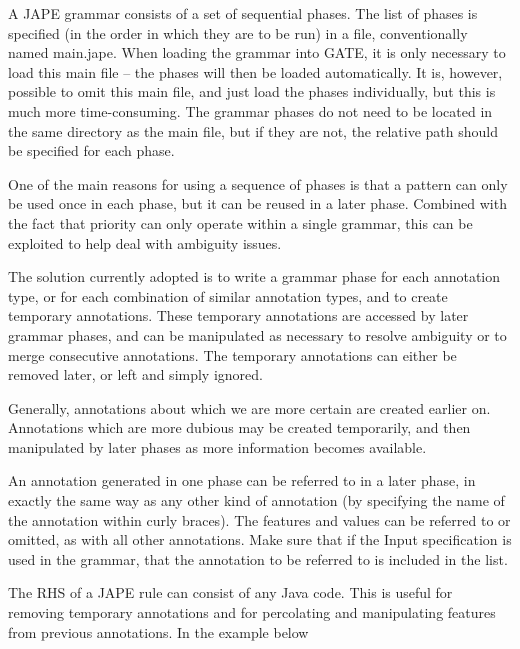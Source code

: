 
A JAPE grammar consists of a set of sequential phases. The list of
phases is specified (in the order in which they are to be run) in a
file, conventionally named main.jape. When loading the grammar into
GATE, it is only necessary to load this main file -- the phases will
then be loaded automatically. It is, however, possible to omit this
main file, and just load the phases individually, but this is much
more time-consuming. The grammar phases do not need to be located in
the same directory as the main file, but if they are not, the relative
path should be specified for each phase.

One of the main reasons for using a sequence of phases is that a
pattern can only be used once in each phase, but it can be reused in a
later phase. Combined with the fact that priority can only operate
within a single grammar, this can be exploited to help deal with
ambiguity issues.

The solution currently adopted is to write a grammar phase for each
annotation type, or for each combination of similar annotation types,
and to create temporary annotations. These temporary annotations are
accessed by later grammar phases, and can be manipulated as necessary
to resolve ambiguity or to merge consecutive annotations. The temporary
annotations can either be removed later, or left and simply ignored.

Generally, annotations about which we are more certain are created
earlier on. Annotations which are more dubious may be created
temporarily, and then manipulated by later phases as more information
becomes available.

An annotation generated in one phase can be referred to in a later phase, in
exactly the same way as any other kind of annotation (by specifying the name of
the annotation within curly braces). The features and values can be referred to
or omitted, as with all other annotations. Make sure that if the Input
specification is used in the grammar, that the annotation to be referred to is
included in the list.

The RHS of a JAPE rule can consist of any Java code.
This is useful for removing temporary annotations and for percolating
and manipulating features from previous annotations. In the example below

